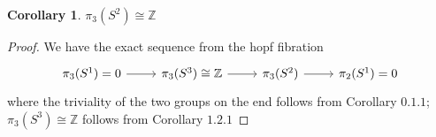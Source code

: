 \documentclass{article}
\theoremstyle{definition}
\theoremstyle{definition}
\theoremstyle{definition}
\theoremstyle{definition}
\theoremstyle{definition}
\theoremstyle{definition}
\newtheorem{corollary}{Corollary}[theorem]
\theoremstyle{definition}
\begin{document}
\begin{tcolorbox}[colback=green!5!white,colframe=green!30!white]
\begin{corollary}
$\pi_3(S^2)\cong \mathbb{Z}$
\end{corollary}
\end{tcolorbox}
\begin{proof}
    We have the exact sequence from the hopf fibration
    \[
    \begin{tikzcd}
    \pi_3(S^1)=0\arrow[r]&\pi_3(S^3)\cong \mathbb{Z}\arrow[r]&\pi_3(S^2)\arrow[r]&\pi_2(S^1)=0
    \end{tikzcd}
    \]
    where the triviality of the two groups on the end follows from Corollary $0.1.1$; $\pi_3(S^3)\cong \mathbb{Z}$ follows from Corollary $1.2.1$
\end{proof}
\end{document}
